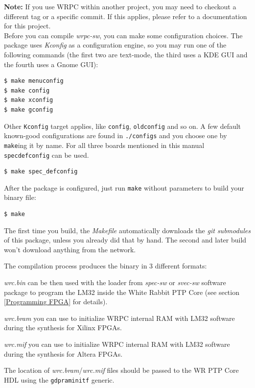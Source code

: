 \documentclass[a4paper, 12pt]{article}
\renewcommand{\_}{\underscore\allowbreak}
\newcommand{\code}[1]{\texttt{#1}}
\begin{document}
\textbf{Note:} If you use WRPC within another project, you may need to checkout
a different tag or a specific commit. If this applies, please refer to a
documentation for this project.\\

Before you can compile \textit{wrpc-sw}, you can make some configuration
choices. The package uses \textit{Kconfig} as a configuration engine, so you may
run one of the following commands (the first two are text-mode, the third uses
a KDE GUI and the fourth uses a Gnome GUI):
\begin{lstlisting}
$ make menuconfig
$ make config
$ make xconfig
$ make gconfig
\end{lstlisting}

Other \code{Kconfig} target applies, like \code{config}, \code{oldconfig}
and so on. A few default known-good configurations are found in
\texttt{./configs} and you choose one by \code{make}ing it by name. For all
three boards mentioned in this manual \code{spec\_defconfig} can be used.
\begin{lstlisting}
$ make spec_defconfig
\end{lstlisting}

After the package is configured, just run \code{make} without parameters to
build your binary file:
\begin{lstlisting}
$ make
\end{lstlisting}

The first time you build, the \textit{Makefile} automatically downloads
the \textit{git submodules} of this package, unless you already did that
by hand. The second and later build won't download anything
from the network.

The compilation process produces the binary in 3 different formats:
\begin{itemize*}
  \item \textit{wrc.bin} can be then used with the loader from \textit{spec-sw}
    or \textit{svec-sw} software package to program the LM32 inside the White
    Rabbit PTP Core (see section \ref{Programming FPGA} for details).
  \item \textit{wrc.bram} you can use to initialize WRPC internal RAM with LM32
    software during the synthesis for Xilinx FPGAs.
  \item \textit{wrc.mif} you can use to initialize WRPC internal RAM with LM32
    software during the synthesis for Altera FPGAs.
\end{itemize*}
The location of \textit{wrc.bram}/\textit{wrc.mif} files should be passed to the
WR PTP Core HDL using the \texttt{g\_dpram\_initf} generic.
\end{document}

